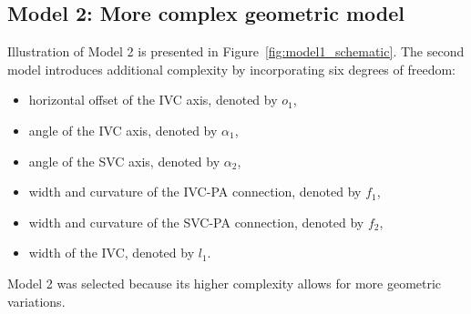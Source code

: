 \subsection*{Model 2: More complex geometric model}\label{mod:model2}
Illustration of Model 2 is presented in Figure~\ref{fig:model1_schematic}. The second model introduces additional complexity by incorporating six degrees of freedom:
\begin{itemize}
	\item horizontal offset of the IVC axis, denoted by $o_1$,
	\item angle of the IVC axis, denoted by $\alpha_1$,
	\item angle of the SVC axis, denoted by $\alpha_2$,
	\item width and curvature of the IVC-PA connection, denoted by $f_1$,
	\item width and curvature of the SVC-PA connection, denoted by $f_2$,
	\item width of the IVC, denoted by $l_1$.
\end{itemize}
Model 2 was selected because its higher complexity allows for more geometric variations.

